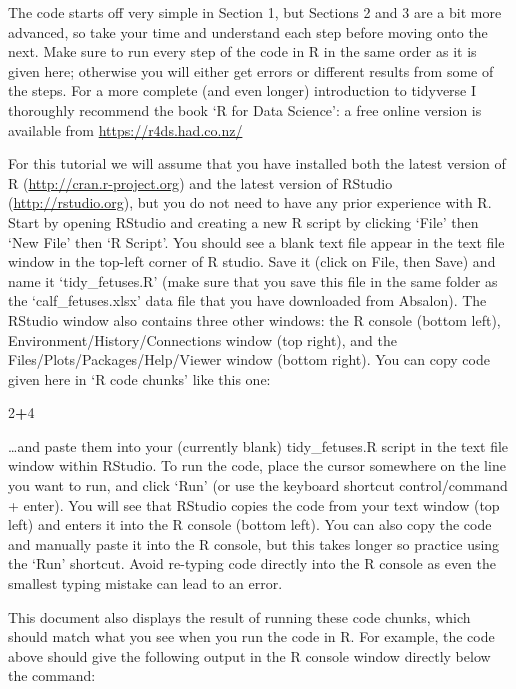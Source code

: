 \documentclass[
]{article}
\newenvironment{Shaded}{\begin{snugshade}}{\end{snugshade}}
\newcommand{\DecValTok}[1]{\textcolor[rgb]{0.00,0.00,0.81}{#1}}
\newcommand{\OperatorTok}[1]{\textcolor[rgb]{0.81,0.36,0.00}{\textbf{#1}}}
\begin{document}
The code starts off very simple in Section 1, but Sections 2 and 3 are a
bit more advanced, so take your time and understand each step before
moving onto the next. Make sure to run every step of the code in R in
the same order as it is given here; otherwise you will either get errors
or different results from some of the steps. For a more complete (and
even longer) introduction to tidyverse I thoroughly recommend the book
`R for Data Science': a free online version is available from
\url{https://r4ds.had.co.nz/}

For this tutorial we will assume that you have installed both the latest
version of R (\url{http://cran.r-project.org}) and the latest version of
RStudio (\url{http://rstudio.org}), but you do not need to have any
prior experience with R. Start by opening RStudio and creating a new R
script by clicking `File' then `New File' then `R Script'. You should
see a blank text file appear in the text file window in the top-left
corner of R studio. Save it (click on File, then Save) and name it
`tidy\_fetuses.R' (make sure that you save this file in the same folder
as the `calf\_fetuses.xlsx' data file that you have downloaded from
Absalon). The RStudio window also contains three other windows: the R
console (bottom left), Environment/History/Connections window (top
right), and the Files/Plots/Packages/Help/Viewer window (bottom right).
You can copy code given here in `R code chunks' like this one:

\begin{Shaded}
\begin{Highlighting}[]
\DecValTok{2}\OperatorTok{+}\DecValTok{4}
\end{Highlighting}
\end{Shaded}

\ldots and paste them into your (currently blank) tidy\_fetuses.R script
in the text file window within RStudio. To run the code, place the
cursor somewhere on the line you want to run, and click `Run' (or use
the keyboard shortcut control/command + enter). You will see that
RStudio copies the code from your text window (top left) and enters it
into the R console (bottom left). You can also copy the code and
manually paste it into the R console, but this takes longer so practice
using the `Run' shortcut. Avoid re-typing code directly into the R
console as even the smallest typing mistake can lead to an error.

This document also displays the result of running these code chunks,
which should match what you see when you run the code in R. For example,
the code above should give the following output in the R console window
directly below the command:
\end{document}
